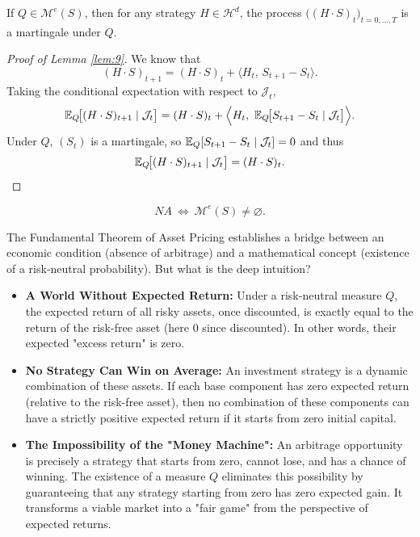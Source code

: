 \begin{lemma}\label{lem:9}
If $Q\in\mathcal{M}^e(S)$, then for any strategy $H\in\mathcal{H}^d$,
the process $\big((H\cdot S)_t\big)_{t=0,\dots,T}$ is a martingale under $Q$.
\end{lemma}

\begin{proof}[Proof of Lemma \ref{lem:9}]
We know that
\[
(H\cdot S)_{t+1}=(H\cdot S)_t+\big\langle H_t,\,S_{t+1}-S_t\big\rangle .
\]
Taking the conditional expectation with respect to $\mathcal{J}_t$,
\[
\E_Q\!\big[(H\cdot S)_{t+1}\mid\mathcal{J}_t\big]
=(H\cdot S)_t+\Big\langle H_t,\ \E_Q\!\big[S_{t+1}-S_t\mid\mathcal{J}_t\big]\Big\rangle .
\]
Under $Q$, $(S_t)$ is a martingale, so $\mathbb{E}_Q[S_{t+1}-S_t\mid\mathcal{J}_t]=0$ and thus
\[
\mathbb{E}_Q\!\big[(H\cdot S)_{t+1}\mid\mathcal{J}_t\big]=(H\cdot S)_t .
\]
\end{proof}

\begin{theorem}
\begin{equation}
NA\ \Longleftrightarrow\ \mathcal{M}^e(S)\neq\varnothing .
\end{equation}
\end{theorem}

\begin{tcolorbox}[title=Intuition: The Economic Meaning of FTAP, colback=blue!5!white, colframe=blue!50!black]
The Fundamental Theorem of Asset Pricing establishes a bridge between an economic condition (absence of arbitrage) and a mathematical concept (existence of a risk-neutral probability). But what is the deep intuition?

\begin{itemize}
    \item \textbf{A World Without Expected Return:} Under a risk-neutral measure $Q$, the expected return of all risky assets, once discounted, is exactly equal to the return of the risk-free asset (here 0 since discounted). In other words, their expected "excess return" is zero.
    \item \textbf{No Strategy Can Win on Average:} An investment strategy is a dynamic combination of these assets. If each base component has zero expected return (relative to the risk-free asset), then no combination of these components can have a strictly positive expected return if it starts from zero initial capital.
    \item \textbf{The Impossibility of the "Money Machine":} An arbitrage opportunity is precisely a strategy that starts from zero, cannot lose, and has a chance of winning. The existence of a measure $Q$ eliminates this possibility by guaranteeing that any strategy starting from zero has zero expected gain. It transforms a viable market into a "fair game" from the perspective of expected returns.
\end{itemize}
\end{tcolorbox}

